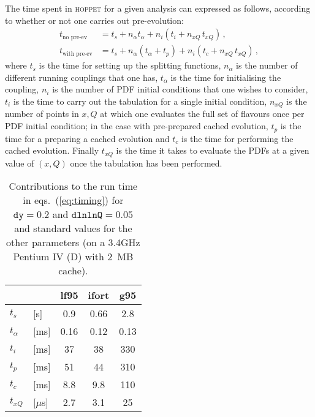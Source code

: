 \documentclass[12pt]{article}
\newcommand{\dy}{\ttt{dy}}
\newcommand{\dlnlnQ}{\ttt{dlnlnQ}}
\newcommand{\hoppet}{\textsc{hoppet}\xspace}
\newcommand{\ttt}[1]{\texttt{#1}}
\begin{document}
The time spent in \hoppet for a given analysis can expressed as
follows, according to whether or not one carries out pre-evolution:
\begin{subequations}
  \label{eq:timing}
  \begin{align}
    t_\text{no pre-ev}   &= t_s + n_\alpha t_\alpha + n_i (t_i  + n_{xQ}\, t_{xQ})\,,\\
    t_\text{with pre-ev} &= t_s + n_\alpha (t_\alpha + t_p) + n_i (t_c + n_{xQ}\,
    t_{xQ})\,,
  \end{align}
\end{subequations}
where $t_s$ is the time for setting up the splitting functions,
$n_\alpha$ is the number of different running couplings that one has,
$t_\alpha$ is the time for initialising the coupling,
%
$n_i$ is the number of PDF initial conditions that one wishes to
consider, $t_i$ is the time to carry out the tabulation for a single
initial condition, $n_{xQ}$ is the number of points in $x,Q$ at which
one evaluates the full set of flavours once per PDF initial condition;
in the case with pre-prepared cached evolution, $t_p$ is the time for a
preparing a cached evolution and $t_c$ is the time for performing the
cached evolution. Finally $t_{xQ}$ is the time it takes to evaluate
the PDFs at a given value of $(x,Q)$ once the tabulation has
been performed.

\begin{table}
  \centering
  \begin{tabular}{|ll|c|c|c|}\hline
          &&     lf95  &  ifort   & g95    \\\hline
   $t_s$ &[s]  &  0.9  &  0.66    & 2.8    \\
   $t_\alpha$ & [ms]                
               &  0.16 &  0.12    & 0.13   \\
   $t_i$ &[ms] &  37   &   38     & 330    \\
   $t_p$ &[ms] &  51   &   44     & 310    \\
   $t_c$ &[ms] &  8.8  &   9.8    & 110    \\
   $t_{xQ}$ &[$\mu$s]           
               &  2.7  &   3.1    &  25    \\
   \hline
  \end{tabular}
  \caption{Contributions to the run time in eqs.~(\ref{eq:timing})
 for    $\dy=0.2$ and 
    $\dlnlnQ=0.05$ and standard values for the other parameters 
    (on a 3.4GHz Pentium IV (D) with 2~MB cache).}
  \label{tab:timings}
\end{table}
\end{document}
